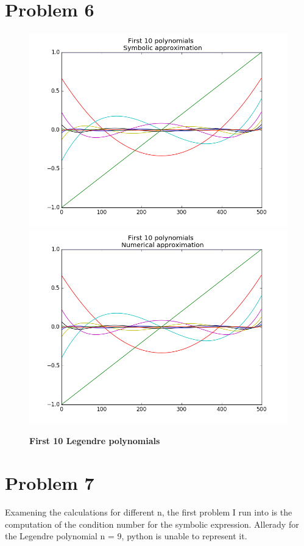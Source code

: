 \documentclass[a4paper,norsk]{article}
\begin{document}
\section*{Problem 6}
\begin{figure}[h!]
	\centering
	\caption*{\textbf{First 10 Legendre polynomials}}
	\includegraphics[scale=0.36]{sym10.png}
	\includegraphics[scale=0.36]{num10.png}
\end{figure}

\newpage
\section*{Problem 7}
Examening the calculations for different n, the first problem I run into is the computation of the condition number for the symbolic expression. Allerady for the Legendre polynomial n = 9, python is unable to represent it.
\end{document}

